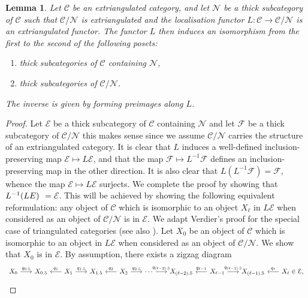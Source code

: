 \documentclass[10pt,twoside, a4paper,reqno]{amsart}
\newcommand{\calN}{\mathcal{N}}
\newcommand{\calC}{\mathcal{C}}
\newcommand{\calE}{\mathcal{E}}
\newcommand{\calF}{\mathcal{F}}
\newtheorem{lemma}[theorem]{Lemma}
\theoremstyle{definition}
\begin{document}
\begin{lemma}\label{lem:Ver2.3.1}
    Let $\calC$ be an extriangulated category, and let $\calN$ be a thick subcategory of $\calC$ such that $\calC/\calN$ is extriangulated and the localisation functor $L\colon\calC \to \calC/\calN$ is an extriangulated functor. 
    The functor $L$ then induces an isomorphism from the first to the second of the following posets:
    \begin{enumerate}
        \item thick subcategories of $\calC$ containing $\calN$,
        \item thick subcategories of $\calC/\calN$.
    \end{enumerate}
    The inverse is given by forming preimages along $L$.
\end{lemma}
\begin{proof}
    Let $\calE$ be a thick subcategory of $\calC$ containing $\calN$ and let $\calF$ be a thick subcategory of $\calC/\calN$ this makes sense since we assume $\calC/\calN$ carries the structure of an extriangulated category. It is clear that $L$ induces a well-defined inclusion-preserving map $\mathcal{E}\mapsto L\mathcal{E}$, and that the map $\mathcal{F}\mapsto L^{-1}\mathcal{F}$ defines an inclusion-preserving map in the other direction. It is also clear that $L(L^{-1}\mathcal{F})=\mathcal{F}$, whence the map $\mathcal{E}\mapsto L\mathcal{E}$ surjects. 
    We complete the proof by showing that {$L^{-1}(L \mathcal \calE)$} {$= \calE$}. This will be achieved by showing the following {equivalent reformulation}: any object {of} $\calC$ which is isomorphic to an object {$X_\ell$} in ${L} \mathcal{E}$ when considered as an object {of} $\calC/\calN$ is in $\mathcal{E}$. We adapt Verdier's proof for the special case of triangulated categories \cite[{{Prop.} 2.3.1(d)$^{\mathrm{bis}}$}]{Ver96} (see also \cite[{Lem.} 3.1]{Tak13}).
    Let $X_0$ be an object {of} $\calC$ which is isomorphic to an object in ${L}\mathcal{E}$ when considered as an object {of} $\calC/\calN$. We show that $X_0$ is in $\mathcal{E}$. By assumption, there exists a zigzag diagram
    \begin{equation*}
        \begin{tikzcd}[row sep=2em,column sep=1.75em]
X_0 \arrow[r, "q_{0.5}"] & X_{0.5} & X_1 \arrow[l, "q_1"'] \arrow[r, "q_{1.5}"] & X_{1.5} & X_{2} \arrow[l, "q_2"'] \arrow[r, "q_{2.5}"] & \cdots \arrow[r, "q_{(\ell-2).5}"] & X_{(\ell-2).5} & X_{\ell-1} \arrow[r, "q_{(\ell-1).5}"] \arrow[l, "q_{\ell-1}"'] & X_{(\ell-1).5}                                                                                       & X_\ell \in \mathcal{E}, \arrow[l, "q_{\ell}"']                 

\end{tikzcd}
\end{equation*}
\end{proof}
\end{document}
